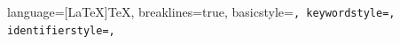 
\usepackage{listings}
\lstset
{
    language=[LaTeX]TeX,
    breaklines=true,
    basicstyle=\tt\scriptsize,
    keywordstyle=\color{blue},
    identifierstyle=\color{black},
}









\usepackage{array} %
\usepackage[export]{adjustbox}
\usepackage{multirow}
\usepackage{tabularx}
\usepackage{extarrows}  %


\usepackage[
    backend=biber, 
    style=numeric-comp, 
    sortcites=true, 
    sorting=none, 
    defernumbers=true,
]{biblatex}       
\appto{\bibsetup}{\sloppy} %

\allowdisplaybreaks

